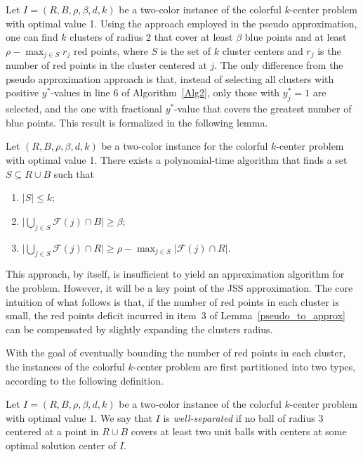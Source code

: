Let $I = (R,B,\rho,\beta,d,k)$ be a two-color instance of the colorful $k$-center problem with optimal value 1. 
Using the approach employed in the pseudo approximation, one can find $k$ clusters of radius 2 that cover at least $\beta$ blue points and at least $\rho - \max_{j \in S} r_j$ red points, where $S$ is the set of $k$ cluster centers and $r_j$ is the number of red points in the cluster centered at $j$. 
The only difference from the pseudo approximation approach is that, instead of selecting all clusters with positive $y^*$-values in line 6 of {Algorithm}~\ref{Alg2}, only those with $y_j^*=1$ are selected, and the one with fractional $y^*$-value that covers the greatest number of blue points. 
This result is formalized in the following lemma.
\begin{lemma}
    \label{pseudo_to_approx}
    Let $(R,B,\rho,\beta,d,k)$ be a two-color instance for the colorful $k$-center problem with optimal value 1. There exists a polynomial-time algorithm that finds a set $S \subseteq R \cup B$ such that 
    \begin{enumerate}
        \item \( |S| \leq k\);
        \item 
        \(
            \Big| \bigcup_{j \in S} \mathcal{F}(j) \cap B\Big| \geq \beta
            \);
        \item
        \(
            \Big| \bigcup_{j \in S} \mathcal{F}(j) \cap R\Big| \geq \rho - \max_{j \in S} | \mathcal{F}(j) \cap R|.
        \)
    \end{enumerate}
\end{lemma}
This approach, by itself, is insufficient to yield an approximation algorithm for the problem. 
However, it will be a key point of the JSS approximation. 
The core intuition of what follows is that, if the number of red points in each cluster is small, the red points deficit incurred in item~3 of Lemma~\ref{pseudo_to_approx} can be compensated by slightly expanding the clusters radius.

With the goal of eventually bounding the number of red points in each cluster, the instances of the colorful $k$-center problem are first partitioned into two types, according to the following definition.

\begin{definition}
    Let $I = (R,B,\rho,\beta,d,k)$ be a two-color instance of the colorful $k$-center problem with optimal value $1$.
    We say that $I$ is \emph{well-separated} if no ball of radius 3 centered at a point in $R \cup B$ covers at least two unit balls with centers at some optimal solution center of $I$.
\end{definition}

